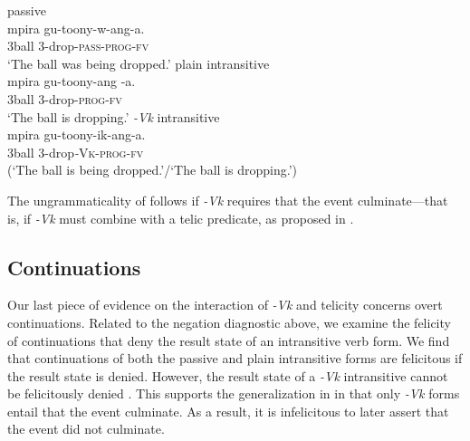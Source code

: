 \documentclass[output=paper]{langsci/lanmgscibook}
\begin{document}
\ea\label{ex:gluckman:14} 
  \ea\label{ex:gluckman:14a}
  {{passive}}\\
  \gll mpira gu-toony-w-ang-a.\\
      3ball  3-drop-\textsc{pass}-\textsc{prog}-\textsc{fv}\\
  \glt ‘The ball was being dropped.’
  \ex\label{ex:gluckman:14b}
  {{ plain intransitive}}\\
  \gll mpira gu-toony-ang -a.\\
      3ball  3-drop-\textsc{prog}-\textsc{fv}\\
  \glt ‘The ball is dropping.’
  \ex\label{ex:gluckman:14c}
  {{ \textit{-Vk} intransitive}}\\
  \gll *mpira gu-toony-ik-ang-a.\\
	3ball    3-drop\textit{-}\textsc{Vk}-\textsc{prog}-\textsc{fv}\\
  \glt  (‘The ball is being dropped.’/‘The ball is dropping.’)
  \z
\z

The ungrammaticality of  follows if \textit{-Vk} requires that the event culminate—that is, if \textit{-Vk} must combine with a telic predicate, as proposed in .

\subsection{Continuations}

Our last piece of evidence on the interaction of \textit{-Vk} and telicity concerns overt continuations. Related to the negation diagnostic above, we examine the felicity of continuations that deny the result state of an intransitive verb form. We find that continuations of both the passive  and plain intransitive  forms are felicitous if the result state is denied. However, the result state of a \textit{-Vk} intransitive cannot be felicitously denied . This supports the generalization in  in that only \textit{-Vk} forms entail that the event culminate. As a result, it is infelicitous to later assert that the event did not culminate.
\end{document}
